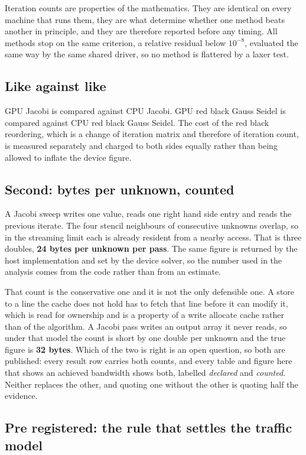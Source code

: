 Iteration counts are properties of the mathematics. They are identical on every
machine that runs them, they are what determine whether one method beats another
in principle, and they are therefore reported before any timing. All methods stop
on the same criterion, a relative residual below $10^{-8}$, evaluated the same
way by the same shared driver, so no method is flattered by a laxer test.

\subsection{Like against like}

GPU Jacobi is compared against CPU Jacobi. GPU red black Gauss Seidel is
compared against CPU red black Gauss Seidel. The cost of the red black
reordering, which is a change of iteration matrix and therefore of iteration
count, is measured separately and charged to both sides equally rather than
being allowed to inflate the device figure.

\subsection{Second: bytes per unknown, counted}

A Jacobi sweep writes one value, reads one right hand side entry and reads the
previous iterate. The four stencil neighbours of consecutive unknowns overlap,
so in the streaming limit each is already resident from a nearby access. That is
three doubles, \textbf{24 bytes per unknown per pass}. The same figure is
returned by the host implementation and set by the device solver, so the number
used in the analysis comes from the code rather than from an estimate.

That count is the conservative one and it is not the only defensible one. A
store to a line the cache does not hold has to fetch that line before it can
modify it, which is read for ownership and is a property of a write allocate
cache rather than of the algorithm. A Jacobi pass writes an output array it
never reads, so under that model the count is short by one double per unknown
and the true figure is \textbf{32 bytes}. Which of the two is right is an open
question, so both are published: every result row carries both counts, and every
table and figure here that shows an achieved bandwidth shows both, labelled
\emph{declared} and \emph{counted}. Neither replaces the other, and quoting one
without the other is quoting half the evidence.

\subsection{Pre registered: the rule that settles the traffic model}
\label{sec:preregistered-traffic}

